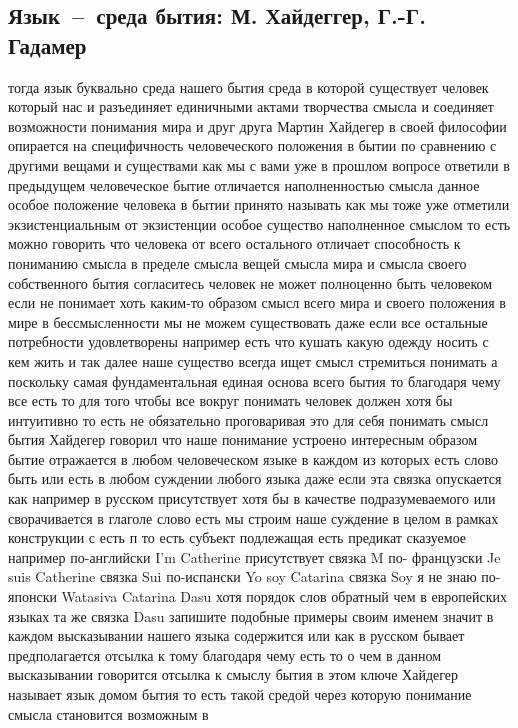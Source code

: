\subsection{Язык~--~среда бытия: М. Хайдеггер, Г.-Г. Гадамер}
тогда язык буквально среда нашего бытия среда в которой существует человек
который нас и разъединяет единичными актами творчества смысла и соединяет
возможности понимания мира и друг друга Мартин Хайдегер в своей философии
опирается на специфичность человеческого положения в бытии по сравнению с
другими вещами и существами как мы с вами уже в прошлом вопросе ответили в
предыдущем человеческое бытие отличается наполненностью смысла данное особое
положение человека в бытии принято называть как мы тоже уже отметили
экзистенциальным от экзистенции особое существо наполненное смыслом то есть
можно говорить что человека от всего остального отличает способность к пониманию
смысла в пределе смысла вещей смысла мира и смысла своего собственного бытия
согласитесь человек не может полноценно быть человеком если не понимает хоть
каким-то образом смысл всего мира и своего положения в мире в бессмысленности мы
не можем существовать даже если все остальные потребности удовлетворены например
есть что кушать какую одежду носить с кем жить и так далее наше существо всегда
ищет смысл стремиться понимать а поскольку самая фундаментальная единая основа
всего бытия то благодаря чему все есть то для того чтобы все вокруг понимать
человек должен хотя бы интуитивно то есть не обязательно проговаривая это для
себя понимать смысл бытия Хайдегер говорил что наше понимание устроено
интересным образом бытие отражается в любом человеческом языке в каждом из
которых есть слово быть или есть в любом суждении любого языка даже если эта
связка опускается как например в русском присутствует хотя бы в качестве
подразумеваемого или сворачивается в глаголе слово есть мы строим наше суждение
в целом в рамках конструкции с есть п то есть субъект подлежащая есть предикат
сказуемое например по-английски I'm Catherine присутствует связка M по-
французски Je suis Catherine связка Sui по-испански Yo soy Catarina связка Soy я
не знаю по-японски Watasiva Catarina Dasu хотя порядок слов обратный чем в
европейских языках та же связка Dasu запишите подобные примеры своим именем
значит в каждом высказывании нашего языка содержится или как в русском бывает
предполагается отсылка к тому благодаря чему есть то о чем в данном высказывании
говорится отсылка к смыслу бытия в этом ключе Хайдегер называет язык домом бытия
то есть такой средой через которую понимание смысла становится возможным в
